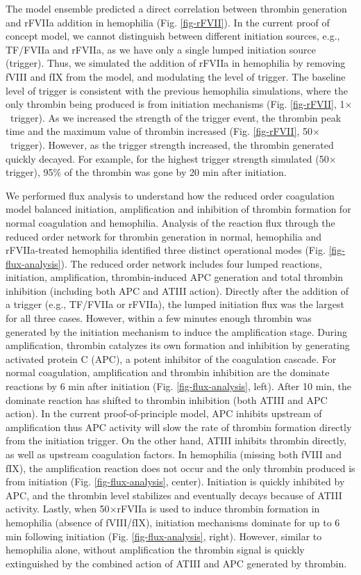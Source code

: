 \documentclass[12pt]{article}
\begin{document}
The model ensemble predicted a direct correlation between thrombin generation and rFVIIa addition in hemophilia (Fig. \ref{fig-rFVII}).
In the current proof of concept model, we cannot distinguish between different initiation sources, e.g., TF/FVIIa and rFVIIa, as we have only a single lumped initiation source (trigger).
Thus, we simulated the addition of rFVIIa in hemophilia by removing fVIII and fIX from the model, and modulating the level of trigger.
The baseline level of trigger is consistent with the previous hemophilia simulations, where the only thrombin being produced is from initiation mechanisms  (Fig. \ref{fig-rFVII}, 1$\times$~trigger).
As we increased the strength of the trigger event, the thrombin peak time and the maximum value of thrombin increased (Fig. \ref{fig-rFVII}, 50$\times$~trigger). 
However, as the trigger strength increased, the thrombin generated quickly decayed.
For example, for the highest trigger strength simulated (50$\times$trigger), 95\% of the thrombin was gone by 20 min after initiation. 


We performed flux analysis to understand how the reduced order coagulation model balanced initiation, amplification and inhibition of thrombin formation for normal coagulation and hemophilia.
Analysis of the reaction flux through the reduced order network for thrombin generation in normal, hemophilia and rFVIIa-treated hemophilia identified three distinct operational modes (Fig. \ref{fig-flux-analysis}).
The reduced order network includes four lumped reactions, initiation, amplification, thrombin-induced APC generation and total thrombin inhibition (including both APC and ATIII action).
Directly after the addition of a trigger (e.g., TF/FVIIa or rFVIIa), the lumped initiation flux was the largest for all three cases.
However, within a few minutes enough thrombin was generated by the initiation mechanism to induce the amplification stage. 
During amplification, thrombin catalyzes its own formation and inhibition by generating activated protein C (APC), a potent inhibitor of the coagulation cascade.
For normal coagulation, amplification and thrombin inhibition are the dominate reactions by 6 min after initiation (Fig. \ref{fig-flux-analysis}, left). 
After 10 min, the dominate reaction has shifted to thrombin inhibition (both ATIII and APC action). In the current proof-of-principle model, 
APC inhibits upstream of amplification thus APC activity will slow the rate of thrombin formation directly from the initiation trigger. 
On the other hand, ATIII inhibits thrombin directly, as well as upstream coagulation factors.
In hemophilia (missing both fVIII and fIX), the amplification reaction does not occur and the only thrombin produced is from initiation (Fig. \ref{fig-flux-analysis}, center).
Initiation is quickly inhibited by APC, and the thrombin level stabilizes and eventually decays because of ATIII activity. 
Lastly, when 50$\times$rFVIIa is used to induce thrombin formation in hemophilia (absence of fVIII/fIX), 
initiation mechanisms dominate for up to 6 min following initiation (Fig. \ref{fig-flux-analysis}, right). 
However, similar to hemophilia alone, without amplification the thrombin signal is quickly extinguished by the combined action of ATIII and APC generated by thrombin.   
\end{document}
